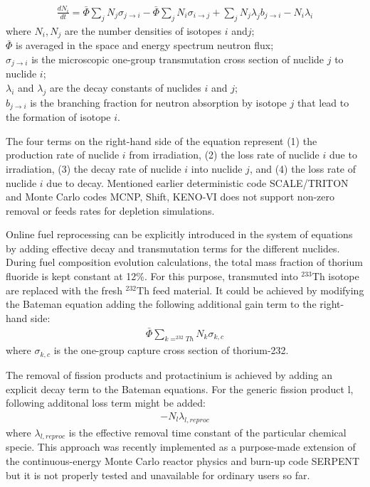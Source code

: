 \begin{align*}
\frac{dN_i}{dt}=\bar{\Phi}\sum\limits_{j}N_{j}\sigma_{j \rightarrow i} - \bar{\Phi}\sum\limits_{j}N_{i}\sigma_{i \rightarrow j} + \sum\limits_{j}N_{j}\lambda_{j}b_{j \rightarrow i} - N_{i}\lambda_{i}
\end{align*}
where $N_i,N_j$ are the number densities of isotopes $i$ and$j$;\\
$\bar{\Phi}$ is averaged in the space and energy spectrum neutron flux;\\
$\sigma_{j \rightarrow i}$ is the microscopic one-group transmutation cross section of nuclide $j$ to nuclide $i$;\\
$\lambda_i$ and $\lambda_j$ are the decay constants of nuclides $i$ and $j$;\\
$b_{j \to i}$ is the branching fraction for neutron absorption by isotope $j$ that lead to the formation of isotope $i$.

The four terms on the right-hand side of the equation represent (1) the production rate of nuclide $i$ from irradiation, (2) the loss rate of nuclide $i$ due to irradiation, (3) the decay rate of nuclide $i$ into nuclide $j$, and (4) the loss rate of nuclide $i$ due to decay. Mentioned earlier deterministic code SCALE/TRITON and Monte Carlo codes MCNP, Shift, KENO-VI does not support non-zero removal or feeds rates for depletion simulations.

Online fuel reprocessing can be explicitly introduced in the system of equations by adding effective decay and transmutation terms for the different nuclides. During fuel composition evolution calculations, the total mass fraction of thorium fluoride is kept constant at 12\%. For this purpose, transmuted into $^{233}$Th isotope are replaced with the fresh $^{232}$Th feed material. It could be achieved by modifying the Bateman equation adding the following additional gain term to the right-hand side:
\begin{align*}
\bar{\Phi}\sum\limits_{k=^{232}Th}N_{k}\sigma_{k,c}
\end{align*}
where $\sigma_{k,c}$ is the one-group capture cross section of thorium-232.

The removal of fission products and protactinium is achieved by adding an explicit decay term to the Bateman equations. For the generic fission product l, following additonal loss term might be added:
\begin{align*}
- N_{l}\lambda_{l,reproc}
\end{align*}
where $\lambda_{l,reproc}$ is the effective removal time constant of the particular chemical specie. This approach was recently implemented as a purpose-made extension of the continuous-energy Monte Carlo reactor physics and burn-up code SERPENT \cite{aufiero_extended_2013} but it is not properly tested and unavailable for ordinary users so far.


